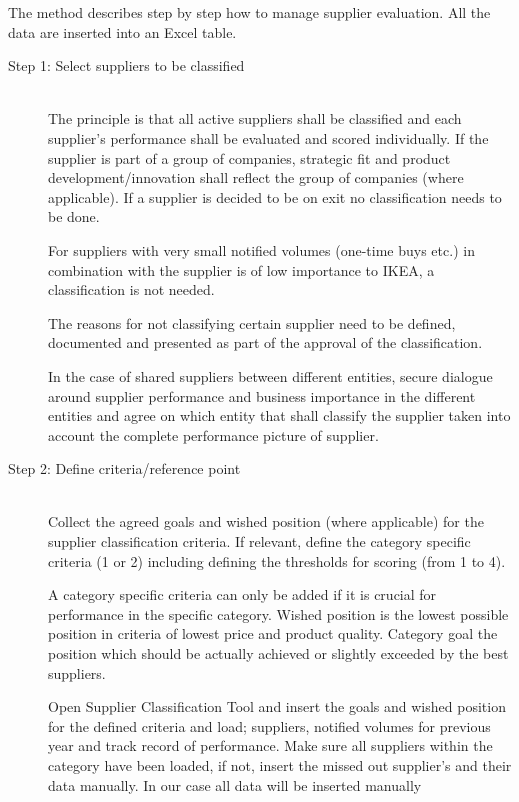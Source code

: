 \documentclass[oneside,12pt]{article}%
\begin{document}
The method describes step by step how to manage supplier evaluation. All the data are inserted into an Excel table.


\begin{description}
  \item[Step 1: Select suppliers to be classified] \hfill \\
  The principle is that all active suppliers shall be classified and each supplier’s performance shall be evaluated and scored individually. If the supplier is part of a group of companies, strategic fit and product development/innovation shall reflect the group of companies (where applicable). If a supplier is decided to be on exit no classification needs to be done. \par
  For suppliers with very small notified volumes (one-time buys etc.) in combination with the supplier is of low importance to IKEA, a classification is not needed. \par
  The reasons for not classifying certain supplier need to be defined, documented and presented as part of the approval of the classification. \par
  In the case of shared suppliers between different entities, secure dialogue around supplier performance and business importance in the different entities and agree on which entity that shall classify the supplier taken into account the complete performance picture of supplier.


  \item[Step 2: Define criteria/reference point] \hfill \\
  Collect the agreed goals and wished position (where applicable) for the supplier classification criteria. If relevant, define the category specific criteria (1 or 2) including defining the thresholds for scoring (from 1 to 4).\par
  A category specific criteria can only be added if it is crucial for performance in the specific category. \apr
  Wished position is the lowest possible position in criteria of lowest price and product quality. Category goal the position which should be actually achieved or slightly exceeded by the best suppliers.\par
  Open Supplier Classification Tool and insert the goals and wished position for the defined criteria and load; suppliers, notified volumes for previous year and track record of performance. Make sure all suppliers within the category have been loaded, if not, insert the missed out supplier's and their data manually. In our case all data will be inserted manually


\end{description}
\end{document}

